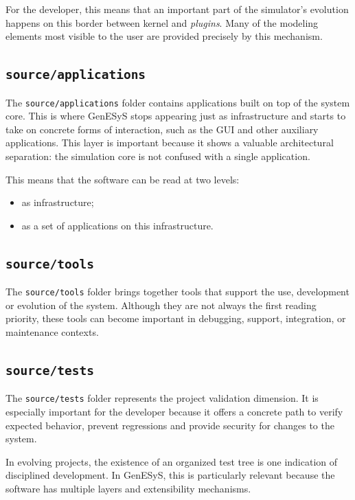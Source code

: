 For the developer, this means that an important part of the simulator's evolution happens on this border between kernel and \textit{plugins}. Many of the modeling elements most visible to the user are provided precisely by this mechanism.

\subsection{\texttt{source/applications}}
\label{subsec:cap6_source_applications}

The \texttt{source/applications} folder contains applications built on top of the system core. This is where GenESyS stops appearing just as infrastructure and starts to take on concrete forms of interaction, such as the GUI and other auxiliary applications. This layer is important because it shows a valuable architectural separation: the simulation core is not confused with a single application.

This means that the software can be read at two levels:
\begin{itemize}
 \item as infrastructure;
 \item as a set of applications on this infrastructure.
\end{itemize}

\subsection{\texttt{source/tools}}
\label{subsec:cap6_source_tools}

The \texttt{source/tools} folder brings together tools that support the use, development or evolution of the system. Although they are not always the first reading priority, these tools can become important in debugging, support, integration, or maintenance contexts.

\subsection{\texttt{source/tests}}
\label{subsec:cap6_source_tests}

The \texttt{source/tests} folder represents the project validation dimension. It is especially important for the developer because it offers a concrete path to verify expected behavior, prevent regressions and provide security for changes to the system.

In evolving projects, the existence of an organized test tree is one indication of disciplined development. In GenESyS, this is particularly relevant because the software has multiple layers and extensibility mechanisms.


